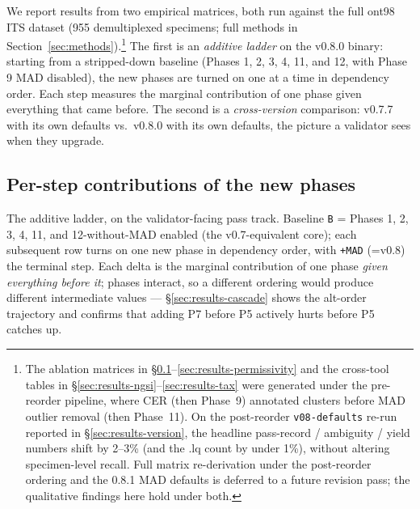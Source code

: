 \documentclass[11pt]{article}
\begin{document}
We report results from two empirical matrices, both run against the full
ont98 ITS dataset (955 demultiplexed specimens; full methods in
Section~\ref{sec:methods}).\footnote{The ablation matrices in
§\ref{sec:results-additive}--\ref{sec:results-permissivity} and the
cross-tool tables in §\ref{sec:results-ngsi}--\ref{sec:results-tax}
were generated under the pre-reorder pipeline, where CER (then
Phase~9) annotated clusters before MAD outlier removal (then
Phase~11). On the post-reorder \texttt{v08-defaults} re-run reported
in §\ref{sec:results-version}, the headline pass-record / ambiguity /
yield numbers shift by 2--3\% (and the .lq count by under 1\%),
without altering specimen-level recall. Full matrix re-derivation
under the post-reorder ordering and the 0.8.1 MAD defaults is
deferred to a future revision pass; the qualitative findings here
hold under both.} The first is an \emph{additive ladder} on the
v0.8.0 binary: starting from a stripped-down baseline (Phases 1, 2, 3, 4,
11, and 12, with Phase 9 MAD disabled), the new phases are turned on one at a time in
dependency order. Each step measures the marginal contribution of one
phase given everything that came before. The second is a
\emph{cross-version} comparison: v0.7.7 with its own defaults vs.~v0.8.0
with its own defaults, the picture a validator sees when they upgrade.

\subsection{Per-step contributions of the new phases}
\label{sec:results-additive}

The additive ladder, on the validator-facing pass track. Baseline
\texttt{B} = Phases 1, 2, 3, 4, 11, and 12-without-MAD enabled (the
v0.7-equivalent core); each subsequent row turns on one new phase in
dependency order, with \texttt{+MAD} (=v0.8) the terminal step. Each
delta is the marginal contribution of one phase \emph{given everything
before it}; phases interact, so a different ordering would produce
different intermediate values --- §\ref{sec:results-cascade}
shows the alt-order trajectory and confirms that adding P7 before P5
actively hurts before P5 catches up.
\end{document}
